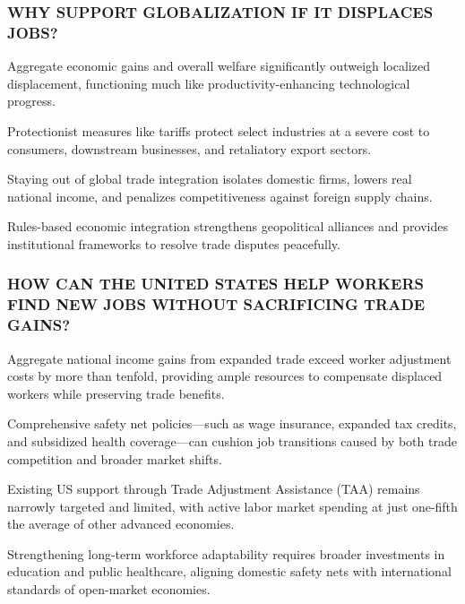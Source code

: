 \documentclass[10pt, aspectratio=169]{beamer}
\begin{document}
\begin{frame}[t]
    \frametitle{WHY SUPPORT GLOBALIZATION IF IT DISPLACES JOBS?}
    \vfill
    \begin{itemize}
        \setlength{\itemsep}{0.35cm}
        {\small
        \item Aggregate economic gains and overall welfare significantly outweigh localized displacement, functioning much like productivity-enhancing technological progress.
        \item Protectionist measures like tariffs protect select industries at a severe cost to consumers, downstream businesses, and retaliatory export sectors.
        \item Staying out of global trade integration isolates domestic firms, lowers real national income, and penalizes competitiveness against foreign supply chains.
        \item Rules-based economic integration strengthens geopolitical alliances and provides institutional frameworks to resolve trade disputes peacefully.
        }
    \end{itemize}
    \vfill
\end{frame}
\begin{frame}[t]
    \frametitle{HOW CAN THE UNITED STATES HELP WORKERS FIND NEW JOBS WITHOUT SACRIFICING TRADE GAINS?}
    \vfill
    \begin{itemize}
        \setlength{\itemsep}{0.35cm}
        {\small
        \item Aggregate national income gains from expanded trade exceed worker adjustment costs by more than tenfold, providing ample resources to compensate displaced workers while preserving trade benefits.
        \item Comprehensive safety net policies—such as wage insurance, expanded tax credits, and subsidized health coverage—can cushion job transitions caused by both trade competition and broader market shifts.
        \item Existing US support through Trade Adjustment Assistance (TAA) remains narrowly targeted and limited, with active labor market spending at just one-fifth the average of other advanced economies.
        \item Strengthening long-term workforce adaptability requires broader investments in education and public healthcare, aligning domestic safety nets with international standards of open-market economies.
        }
    \end{itemize}
    \vfill
\end{frame}
\end{document}
